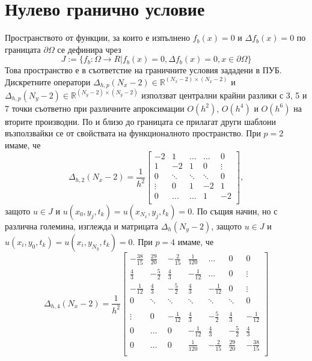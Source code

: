 \documentclass{article}
\newcommand{\be}{\begin{equation}}
\newcommand{\ee}{\end{equation}}
\newcommand{\RR}{\mathbb{R}}
\begin{document}
\section{Нулево гранично условие}

Пространството от функции, за които е изпълнено $f_b(x) = 0$ и $\Delta f_b(x) = 0$ по границата $\partial\Omega$ се дефинира чрез
\be\label{funSpace}
J:=\{ f_b : \Omega \rightarrow R | f_b(x) = 0, \Delta f_b(x) = 0, x \in \partial\Omega\}
\ee
Това пространство е в съответстие на граничните условия зададени в ПУБ. Дискретните оператори $\Delta_{h,p}(N_x-2) \in \RR^{(N_x-2) \times (N_x-2)}$ и $\Delta_{h,p}(N_y-2) \in \RR^{(N_y-2)\times(N_y-2)}$  използват централни крайни разлики с 3, 5 и 7 точки съответно при различните апроксимации $O(h^2)$, $O(h^4)$ и $O(h^6)$ на вторите производни. По и близо до границата се прилагат други шаблони възползвайки се от свойствата на функционалното пространство. При $p=2$ имаме, че 
\[
\Delta_{h,2}(N_x-2) = \frac{1}{h^2}
\begin{bmatrix}
    -2	       & 1        &     \dots   &   \dots        & 0   \\
    1               & -2            &   1           &   0               & \vdots    \\
        0           & \ddots        &    \ddots    &   \ddots       &  0 \\ 
    \vdots       &     0            &  1     	& -2    	   & 1 \\
    0               & \dots          &  \dots         & 1  	   & -2 \\
\end{bmatrix},
\]
защото $u \in J$ и $u(x_0, y_j, t_k) = u(x_{N_x}, y_j, t_k) = 0$. По същия начин, но с различна големина, изглежда и матрицата $\Delta_{h}(N_y-2)$, защото $u \in J$ и $u(x_i, y_0, t_k) = u(x_i, y_{N_y}, t_k) = 0$.  При $p=4$ имаме, че 
\[
\Delta_{h,4}(N_x-2) = \frac{1}{h^2}
\begin{bmatrix}
     -\frac{38}{15}	& \frac{29}{20}       & -\frac{2}{15}	&    \frac{1}{120}     &    \dots      	   &   0           & 0    \\
    \frac{4}{3}          &-\frac{5}{2}    	& \frac{4}{3}	&   -\frac{1}{12}	  &   \dots      	  &   0	           & \vdots  \\
    -\frac{1}{12}	& \frac{4}{3}         	& -\frac{5}{2}	&  \frac{4}{3}    	 &   -\frac{1}{12}	  &      0           &\vdots    \\
        0           		& \ddots        	&    \ddots   		 &   \ddots      	 &     \ddots      	  &  \ddots        &    0 \\	
\\
   \vdots      		 & 0           		 &  -\frac{1}{12}	& \frac{4}{3}    	& -\frac{5}{2}	&  \frac{4}{3}   &   -\frac{1}{12} \\
    0      		 &  \dots           	 &   0     		& -\frac{1}{12} 	 & \frac{4}{3} 	 & -\frac{5}{2}  &  \frac{4}{3}\\
    0              		 & \dots          	&  0              		 &\frac{1}{120} 	 &  -\frac{2}{15} 	& \frac{29}{20} & -\frac{38}{15}\\
\end{bmatrix}
\]
\end{document}
